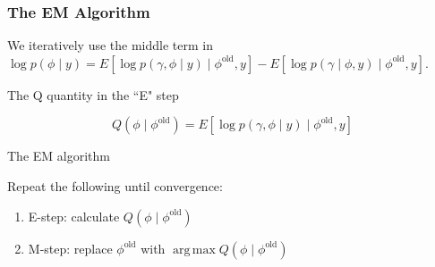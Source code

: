 \documentclass{beamer}
\DeclareMathOperator*{\argmax}{arg\,max}
\begin{document}
\begin{frame}
\frametitle{The EM Algorithm}

We iteratively use the middle term in
$\log p(\phi \mid y) =  E\left[ \log p(\gamma, \phi \mid y) \mid \phi^{\text{old}}, y \right] - E\left[\log p(\gamma \mid \phi, y) \mid \phi^{\text{old}}, y \right]$.

\begin{block}{The Q quantity in the ``E" step}

$$
Q(\phi \mid \phi^{\text{old}}) = E\left[ \log p(\gamma, \phi \mid y) \mid \phi^{\text{old}}, y \right]
$$
\end{block}
\pause

\begin{block}{The EM algorithm}

Repeat the following until convergence:
\begin{enumerate}
\item E-step: calculate $Q(\phi \mid \phi^{\text{old}})$
\item M-step: replace $\phi^{\text{old}}$ with $\argmax Q(\phi \mid \phi^{\text{old}})$
\end{enumerate}
\end{block}
\end{frame}
\end{document}
